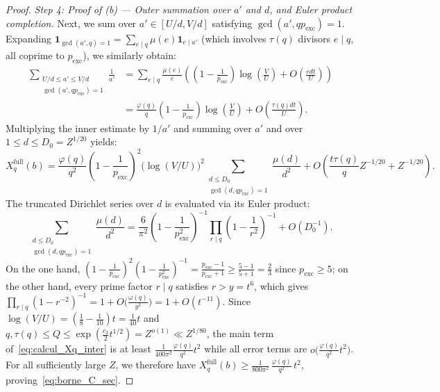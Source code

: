 \documentclass[11pt, a4paper]{article}
\theoremstyle{plain}
\theoremstyle{definition}
\newcommand{\ind}{\mathbf{1}}
\begin{document}
\begin{proof}
\medskip\noindent
\emph{Step 4: Proof of (b) --- Outer summation over $a'$ and $d$, and Euler product completion.} Next, we sum over $a' \in [U/d, V/d]$ satisfying $\gcd(a', q p_{\mathrm{exc}}) = 1$. Expanding $\ind_{\gcd(a', q)=1} = \sum_{e \mid q} \mu(e) \ind_{e \mid a'}$ (which involves $\tau(q)$ divisors $e \mid q$, all coprime to $p_{\mathrm{exc}}$), we similarly obtain:
\[
\begin{aligned}
\sum_{\substack{U/d \le a' \le V/d \\ \gcd(a', q p_{\mathrm{exc}}) = 1}} \frac{1}{a'} &= \sum_{e \mid q} \frac{\mu(e)}{e}\left(\left(1 - \frac{1}{p_{\mathrm{exc}}}\right)\log\!\left(\frac{V}{U}\right) + O\!\left(\frac{ed t}{U}\right)\right) \\
&= \frac{\varphi(q)}{q}\left(1 - \frac{1}{p_{\mathrm{exc}}}\right)\log\!\left(\frac{V}{U}\right) + O\!\left(\frac{\tau(q)d t}{U}\right).
\end{aligned}
\]
Multiplying the inner estimate by $1/a'$ and summing over $a'$ and over $1 \le d \le D_0 = Z^{1/20}$ yields:
\begin{equation}\label{eq:calcul_Xq_inter}
X_q^{\mathrm{full}}(b) = \frac{\varphi(q)}{q^2}\left(1 - \frac{1}{p_{\mathrm{exc}}}\right)^2 \big(\log(V/U)\big)^2 \sum_{\substack{d \le D_0 \\ \gcd(d, q p_{\mathrm{exc}}) = 1}} \frac{\mu(d)}{d^2} + O\!\left(\frac{t \tau(q)}{q} Z^{-1/20} + Z^{-1/20}\right).
\end{equation}
The truncated Dirichlet series over $d$ is evaluated via its Euler product:
\[
\sum_{\substack{d \le D_0 \\ \gcd(d, q p_{\mathrm{exc}}) = 1}} \frac{\mu(d)}{d^2} = \frac{6}{\pi^2}\left(1 - \frac{1}{p_{\mathrm{exc}}^2}\right)^{-1} \prod_{r \mid q}\left(1 - \frac{1}{r^2}\right)^{-1} + O(D_0^{-1}).
\]
On the one hand, $\left(1 - \frac{1}{p_{\mathrm{exc}}}\right)^2 \left(1 - \frac{1}{p_{\mathrm{exc}}^2}\right)^{-1} = \frac{p_{\mathrm{exc}}-1}{p_{\mathrm{exc}}+1} \ge \frac{5-1}{5+1} = \frac{2}{3}$ since $p_{\mathrm{exc}} \ge 5$; on the other hand, every prime factor $r \mid q$ satisfies $r > y = t^6$, which gives $\prod_{r \mid q}(1 - r^{-2})^{-1} = 1 + O\big(\frac{\omega(q)}{y^2}\big) = 1 + O(t^{-11})$. Since $\log(V/U) = \left(\frac{1}{8} - \frac{1}{10}\right)t = \frac{1}{40}t$ and $q, \tau(q) \le Q \le \exp(\frac{c_3}{2} t^{1/2}) = Z^{o(1)} \ll Z^{1/80}$, the main term of~\eqref{eq:calcul_Xq_inter} is at least $\frac{1}{400\pi^2}\frac{\varphi(q)}{q^2}t^2$ while all error terms are $o\big(\frac{\varphi(q)}{q^2}t^2\big)$. For all sufficiently large $Z$, we therefore have $X_q^{\mathrm{full}}(b) \ge \frac{1}{800\pi^2}\,\frac{\varphi(q)}{q^2}\,t^2$, proving~\eqref{eq:borne_C_sec}.


\end{proof}
\end{document}
